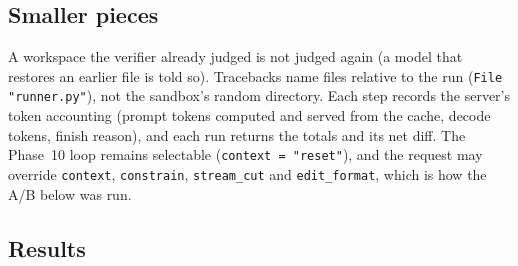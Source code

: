 \subsection{Smaller pieces}

A workspace the verifier already judged is not judged again (a model that
restores an earlier file is told so). Tracebacks name files relative to the run
(\texttt{File "runner.py"}), not the sandbox's random directory. Each step
records the server's token accounting (prompt tokens computed and served from the
cache, decode tokens, finish reason), and each run returns the totals and its net
diff. The Phase~10 loop remains selectable (\texttt{context = "reset"}), and the
request may override \texttt{context}, \texttt{constrain}, \texttt{stream\_cut}
and \texttt{edit\_format}, which is how the A/B below was run.

\subsection{Results}




